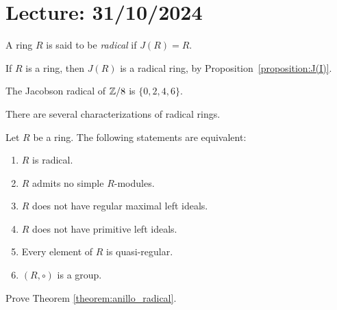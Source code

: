 \section{Lecture: 31/10/2024}

\begin{definition}
A ring $R$ is said to be \emph{radical} if $J(R)=R$. 
\end{definition}

\begin{example}
	If $R$ is a ring, then $J(R)$ is a radical ring, by Proposition~\ref{proposition:J(I)}.
\end{example}

\begin{example}
	The Jacobson radical of $\mathbb{Z}/8$ is $\{0,2,4,6\}$. 
\end{example}

There are several characterizations of radical rings. 

\begin{theorem}
	\label{theorem:anillo_radical}
	Let $R$ be a ring. The following statements are equivalent: 
	\begin{enumerate}
		\item $R$ is radical.
		\item $R$ admits no simple $R$-modules. 
		\item $R$ does not have regular maximal left ideals.
		\item $R$ does not have primitive left ideals.
		\item Every element of $R$ is quasi-regular. 
		\item $(R,\circ)$ is a group. 
	\end{enumerate}
\end{theorem}

\begin{exercise}
    Prove Theorem \ref{theorem:anillo_radical}. 
\end{exercise}
%    
%
%	
%	
%

